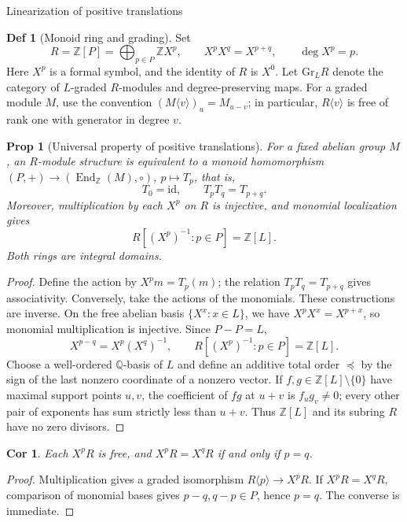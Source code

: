\documentclass[10pt,letterpaper]{amsart}
\makeatletter
\numberwithin{equation}{section}
\newtheorem{prop}[thm]{Prop}
\newtheorem{cor}[thm]{Cor}
\theoremstyle{definition}
\newtheorem{defn}{Def}[section]
\newcommand{\Z}{\mathbb Z}
\newcommand{\Q}{\mathbb Q}
\newcommand{\Gr}{\mathrm{Gr}}
\newcommand{\id}{\mathrm{id}}
\newcommand{\sh}[1]{\langle #1\rangle}
\def\subsection{\@startsection{subsection}{2}
  \z@{.9\linespacing\@plus.3\linespacing}{.4\linespacing}
  {\normalfont\fontsize{11.5}{14}\selectfont\bfseries\boldmath\raggedright}}
\makeatother
\begin{document}
\subsection{Linearization of positive translations}
\begin{defn}[Monoid ring and grading]\label{def:ring}
Set
\[
R=\Z[P]=\bigoplus_{p\in P}\Z X^p,
\qquad X^pX^q=X^{p+q},\qquad \deg X^p=p.
\]
Here $X^p$ is a formal symbol, and the identity of $R$ is $X^0$. Let $\Gr_LR$ denote the category of $L$-graded $R$-modules and degree-preserving maps. For a graded module $M$, use the convention $(M\sh v)_u=M_{u-v}$; in particular, $R\sh v$ is free of rank one with generator in degree $v$.
\end{defn}

\begin{prop}[Universal property of positive translations]\label{prop:translation}
For a fixed abelian group $M$, an $R$-module structure is equivalent to a monoid homomorphism $(P,+)\to(\operatorname{End}_{\Z}(M),\circ)$, $p\mapsto T_p$, that is,
\[
T_0=\id,\qquad T_pT_q=T_{p+q}.
\]
Moreover, multiplication by each $X^p$ on $R$ is injective, and monomial localization gives
\[
R[(X^p)^{-1}:p\in P]=\Z[L].
\]
Both rings are integral domains.
\end{prop}
\begin{proof}
Define the action by $X^pm=T_p(m)$; the relation $T_pT_q=T_{p+q}$ gives associativity. Conversely, take the actions of the monomials. These constructions are inverse.
On the free abelian basis $\{X^x:x\in L\}$, we have $X^pX^x=X^{p+x}$, so monomial multiplication is injective.
Since $P-P=L$,
\[
X^{p-q}=X^p(X^q)^{-1},\qquad R[(X^p)^{-1}:p\in P]=\Z[L].
\]
Choose a well-ordered $\Q$-basis of $L$ and define an additive total order $\preceq$ by the sign of the last nonzero coordinate of a nonzero vector.
If $f,g\in\Z[L]\setminus\{0\}$ have maximal support points $u,v$, the coefficient of $fg$ at $u+v$ is $f_ug_v\ne0$; every other pair of exponents has sum strictly less than $u+v$. Thus $\Z[L]$ and its subring $R$ have no zero divisors.
\end{proof}

\begin{cor}\label{cor:principal}
Each $X^pR$ is free, and $X^pR=X^qR$ if and only if $p=q$.
\end{cor}
\begin{proof}
Multiplication gives a graded isomorphism $R\sh p\to X^pR$. If $X^pR=X^qR$, comparison of monomial bases gives $p-q,q-p\in P$, hence $p=q$. The converse is immediate.
\end{proof}
\end{document}
